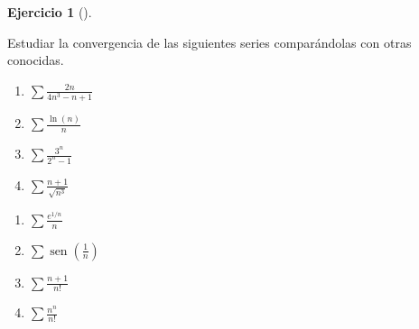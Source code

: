 \documentclass[
  spanish,
  a4paper,
]{scrreport}
\theoremstyle{definition}
\newtheorem{exercise}{Ejercicio}[chapter]
\theoremstyle{remark}
\begin{document}
\begin{exercise}[]\protect\hypertarget{exr-comparacion-series}{}\label{exr-comparacion-series}

Estudiar la convergencia de las siguientes series comparándolas con
otras conocidas.

\begin{enumerate}
\def\labelenumi{\alph{enumi}.}
\item
  \(\sum \frac{2n}{4n^3-n+1}\)
\item
  \(\sum \frac{\ln(n)}{n}\)
\item
  \(\sum \frac{3^n}{2^n-1}\)
\item
  \(\sum \frac{n+1}{\sqrt{n^3}}\)
\end{enumerate}

\begin{enumerate}
\def\labelenumi{\alph{enumi}.}
\setcounter{enumi}{4}
\item
  \(\sum \frac{e^{1/n}}{n}\)
\item
  \(\sum \operatorname{sen}\left(\frac{1}{n}\right)\)
\item
  \(\sum \frac{n+1}{n!}\)
\item
  \(\sum \frac{n^n}{n!}\)
\end{enumerate}

\end{exercise}
\end{document}
